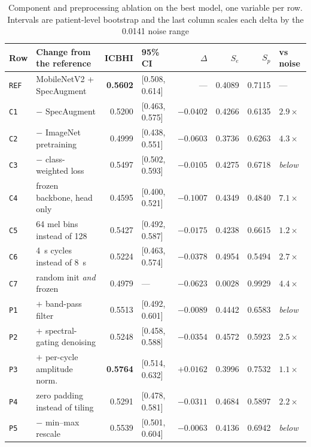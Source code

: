 \documentclass[journal,onecolumn]{IEEEtran}
\newcommand{\best}[1]{\textbf{#1}}
\begin{document}
\begin{table}[hbtp]
\centering
\caption{Component and preprocessing ablation on the best model, one variable per row. Intervals are patient-level bootstrap
and the last column scales each delta by the 0.0141 noise range}
\label{tab:ablation}
\footnotesize
\begin{tabular}{llrlrrrl}
\toprule
Row & Change from the reference & ICBHI & 95\% CI & $\Delta$ & $S_e$ & $S_p$ & vs noise \\
\midrule
\texttt{REF} & MobileNetV2 + SpecAugment & \best{0.5602} & [0.508, 0.614] & --- & 0.4089 & 0.7115 & --- \\
\texttt{C1} & $-$ SpecAugment & 0.5200 & [0.463, 0.575] & $-0.0402$ & 0.4266 & 0.6135 & $2.9\times$ \\
\texttt{C2} & $-$ ImageNet pretraining & 0.4999 & [0.438, 0.551] & $-0.0603$ & 0.3736 & 0.6263 & $4.3\times$ \\
\texttt{C3} & $-$ class-weighted loss & 0.5497 & [0.502, 0.593] & $-0.0105$ & 0.4275 & 0.6718 & \emph{below} \\
\texttt{C4} & frozen backbone, head only & 0.4595 & [0.400, 0.521] & $-0.1007$ & 0.4349 & 0.4840 & $7.1\times$ \\
\texttt{C5} & 64 mel bins instead of 128 & 0.5427 & [0.492, 0.587] & $-0.0175$ & 0.4238 & 0.6615 & $1.2\times$ \\
\texttt{C6} & 4~s cycles instead of 8~s & 0.5224 & [0.463, 0.574] & $-0.0378$ & 0.4954 & 0.5494 & $2.7\times$ \\
\texttt{C7} & random init \emph{and} frozen & 0.4979 & --- & $-0.0623$ & 0.0028 & 0.9929 & $4.4\times$ \\
\midrule
\texttt{P1} & $+$ band-pass filter & 0.5513 & [0.492, 0.601] & $-0.0089$ & 0.4442 & 0.6583 & \emph{below} \\
\texttt{P2} & $+$ spectral-gating denoising & 0.5248 & [0.458, 0.588] & $-0.0354$ & 0.4572 & 0.5923 & $2.5\times$ \\
\texttt{P3} & $+$ per-cycle amplitude norm. & \best{0.5764} & [0.514, 0.632] & $+0.0162$ & 0.3996 & 0.7532 & $1.1\times$ \\
\texttt{P4} & zero padding instead of tiling & 0.5291 & [0.478, 0.581] & $-0.0311$ & 0.4684 & 0.5897 & $2.2\times$ \\
\texttt{P5} & $-$ min--max rescale & 0.5539 & [0.501, 0.604] & $-0.0063$ & 0.4136 & 0.6942 & \emph{below} \\
\bottomrule
\end{tabular}

\vspace{2pt}
\footnotesize 
\end{table}
\end{document}
